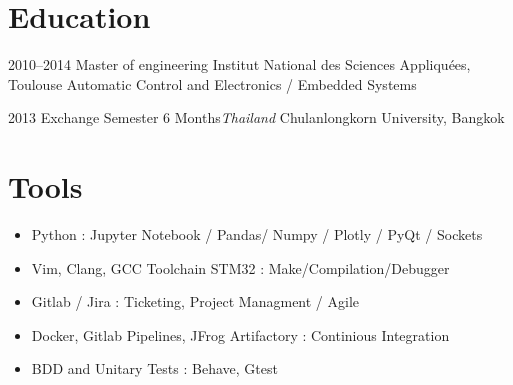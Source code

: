 \documentclass[a4paper]{friggeri-cv} %
\begin{document}
\section{Education}
\begin{entrylist}

 \entry
{2010--2014}
{Master of engineering}
{Institut National des Sciences Appliquées, Toulouse}
{Automatic Control and Electronics / Embedded Systems}


\entry
{2013}
{Exchange Semester 6 Months\textit{Thailand}}
{Chulanlongkorn University, Bangkok}
{}



\end{entrylist}



\section{Tools}

\begin{itemize}
\item Python : Jupyter Notebook / Pandas/ Numpy / Plotly / PyQt / Sockets
\item Vim, Clang, GCC Toolchain STM32 : Make/Compilation/Debugger
\item Gitlab / Jira : Ticketing, Project Managment / Agile 
\item Docker, Gitlab Pipelines, JFrog Artifactory :  Continious Integration
\item BDD and Unitary Tests : Behave, Gtest
\end{itemize}



\end{document}
